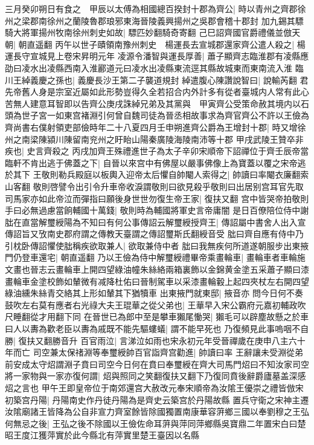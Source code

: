 三月癸卯朔日有食之　甲辰以太傅為相國總百揆封十郡為齊公|{
	時以青州之齊郡徐州之梁郡南徐州之蘭陵魯郡琅邪東海晉陵義興揚州之吳郡會稽十郡封}
加九錫其驃騎大將軍揚州牧南徐州刺史如故|{
	驃匹妙翻騎奇寄翻}
己巳詔齊國官爵禮儀並倣天朝|{
	朝直遥翻}
丙午以世子賾領南豫州刺史　楊運長去宣城郡還家齊公遣人殺之|{
	楊運長守宣城見上卷宋昇明元年}
凌源令潘智與運長厚善|{
	蕭子顯齊志臨淮郡有凌縣應劭曰凌水出凌縣西南入淮酈道元曰凌水出凌縣東流逕其縣故城東而東南流入淮}
臨川王綽義慶之孫也|{
	義慶長沙王第二子襲道規封}
綽遣腹心陳讚說智曰|{
	說輸芮翻}
君先帝舊人身是宗室近屬如此形勢豈得久全若招合内外計多有從者臺城内人常有此心苦無人建意耳智即以告齊公庚戌誅綽兄弟及其黨與　甲寅齊公受策命赦其境内以石頭為世子宮一如東宫褚淵引何曾自魏司徒為晉丞相故事求為齊官齊公不許以王儉為齊尚書右僕射領吏部儉時年二十八夏四月壬申朔進齊公爵為王增封十郡|{
	時又增徐州之南梁陳潁川陳留南兖州之盱眙山陽秦廣陵海陵南沛等十郡}
甲戌武陵王贊卒非疾也|{
	史言齊殺之}
丙戌加齊王殊禮進世子為太子辛卯宋順帝下詔禪位于齊壬辰帝當臨軒不肯出逃于佛蓋之下|{
	自晉以來宫中有佛屋以嚴事佛像上為寶蓋以覆之宋帝逃於其下}
王敬則勒兵殿庭以板輿入迎帝太后懼自帥閹人索得之|{
	帥讀曰率閹衣廉翻索山客翻}
敬則啓譬令出引令升車帝收淚謂敬則曰欲見殺乎敬則曰出居别宫耳官先取司馬家亦如此帝泣而彈指曰願後身世世勿復生帝王家|{
	復扶又翻}
宫中皆哭帝拍敬則手曰必無過慮當餉輔國十萬錢|{
	敬則時為輔國將軍史言帝庸闇}
是日百僚陪位侍中謝朏在直當解璽綬陽為不知曰有何公事傳詔云解璽綬授齊王|{
	傳詔屬中書舍人出入宣傳詔旨又攷南史郡府謂之傳教天臺謂之傳詔璽斯氏翻綬音受}
朏曰齊自應有侍中乃引枕卧傳詔懼使朏稱疾欲取兼人|{
	欲取兼侍中者}
朏曰我無疾何所道遂朝服步出東掖門仍登車還宅|{
	朝直遥翻}
乃以王儉為侍中解璽綬禮畢帝乘畫輪車|{
	畫輪車者車輪施文畫也晉志云畫輪車上開四望綠油幢朱絲絡兩箱裏飾以金錦黄金塗五采蕭子顯曰漆畫輪車金塗校飾如輦微有减降杜佑曰晉制駕車以采漆畫輪轂上起四夾杖左右開四望綠油纁朱絲青交絡其上形如輦其下猶犢車}
出東掖門就東邸|{
	掖音亦}
問今日何不奏鼓吹左右莫有應者右光祿大夫王琨華之從父弟也|{
	王華早入宋公霸府元嘉初輔政吹尺睡翻從才用翻下同}
在晉世已為郎中至是攀車獺尾慟哭|{
	獺毛可以辟塵故懸之於車}
曰人以夀為歡老臣以夀為戚既不能先驅螻蟻|{
	謂不能早死也}
乃復頻見此事嗚咽不自勝|{
	復扶又翻勝音升}
百官雨泣|{
	言涕泣如雨也宋永初元年受晉禪歲在庚申八主六十年而亡}
司空兼太保禇淵等奉璽綬帥百官詣齊宫勸進|{
	帥讀曰率}
王辭讓未受淵從弟前安成太守炤謂淵子賁曰司空今日何在賁曰奉璽綬在齊大司馬門炤曰不知汝家司空將一家物與一家亦復何謂|{
	炤與照同之笑翻復扶又翻下乃復同賁後辭爵廬墓盖深感炤之言也}
甲午王即皇帝位于南郊還宫大赦改元奉宋順帝為汝隂王優崇之禮皆倣宋初築宫丹陽|{
	丹陽南史作丹徒丹陽為是齊史云築宫於丹陽故縣}
置兵守衛之宋神主遷汝隂廟諸王皆降為公自非宣力齊室餘皆除國獨置南康華容蓱鄉三國以奉劉穆之王弘何無忌之後|{
	王弘之後不除國以王儉佐命耳蓱與萍同萍鄉縣吳寶鼎二年置宋白曰楚昭王度江獲萍實於此今縣北有萍實里楚王臺因以名縣}
